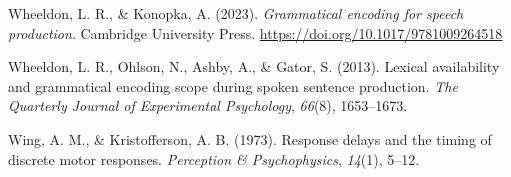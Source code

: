 \documentclass[
  man,floatsintext]{apa7}
\newlength{\cslhangindent}
\newlength{\cslentryspacingunit} %
\newenvironment{CSLReferences}[2] %
 {%
  \setlength{\parindent}{0pt}
  \ifodd #1
  \let\oldpar\par
  \def\par{\hangindent=\cslhangindent\oldpar}
  \fi
  \setlength{\parskip}{#2\cslentryspacingunit}
 }%
 {}
\begin{document}
\begin{CSLReferences}{1}{0}
\leavevmode{}%
Wheeldon, L. R., \& Konopka, A. (2023). \emph{Grammatical encoding for speech production}. Cambridge University Press. \url{https://doi.org/10.1017/9781009264518}

\leavevmode{}%
Wheeldon, L. R., Ohlson, N., Ashby, A., \& Gator, S. (2013). Lexical availability and grammatical encoding scope during spoken sentence production. \emph{The Quarterly Journal of Experimental Psychology}, \emph{66}(8), 1653--1673.

\leavevmode{}%
Wing, A. M., \& Kristofferson, A. B. (1973). Response delays and the timing of discrete motor responses. \emph{Perception \& Psychophysics}, \emph{14}(1), 5--12.

\end{CSLReferences}
\end{document}
